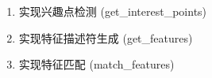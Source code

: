 \begin{enumerate}
    \item 实现兴趣点检测 (get\_interest\_points)
    \item 实现特征描述符生成 (get\_features)
    
    \item 实现特征匹配 (match\_features)
\end{enumerate}
